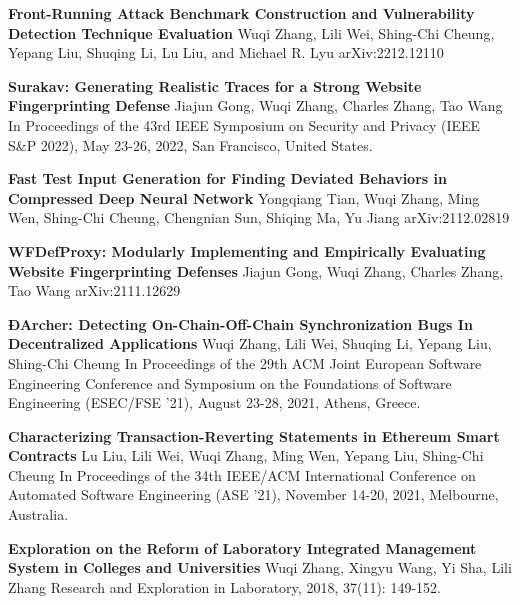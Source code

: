 %
%
%


\begin{scholarship}
	{\textbf{Front-Running Attack Benchmark Construction and Vulnerability Detection Technique Evaluation}}
	{Wuqi Zhang, Lili Wei, Shing-Chi Cheung, Yepang Liu, Shuqing Li, Lu Liu, and Michael R. Lyu}
	\scholarshipentry{}
	{arXiv:2212.12110}

	{\textbf{Surakav: Generating Realistic Traces for a Strong Website Fingerprinting Defense}}
	{Jiajun Gong, Wuqi Zhang, Charles Zhang, Tao Wang}
	\scholarshipentry{}
	{In Proceedings of the 43rd IEEE Symposium on Security and Privacy (IEEE S\&P 2022), May 23-26, 2022, San Francisco, United States.}

	{\textbf{Fast Test Input Generation for Finding Deviated Behaviors in Compressed Deep Neural Network}}
	{Yongqiang Tian, Wuqi Zhang, Ming Wen, Shing-Chi Cheung, Chengnian Sun, Shiqing Ma, Yu Jiang}
	\scholarshipentry{}
	{arXiv:2112.02819}

	{\textbf{WFDefProxy: Modularly Implementing and Empirically Evaluating Website Fingerprinting Defenses}}
	{Jiajun Gong, Wuqi Zhang, Charles Zhang, Tao Wang}
	\scholarshipentry{}
	{arXiv:2111.12629}

	{\textbf{ÐArcher: Detecting On-Chain-Off-Chain Synchronization Bugs In Decentralized Applications}}
	{Wuqi Zhang, Lili Wei, Shuqing Li, Yepang Liu, Shing-Chi Cheung}
	\scholarshipentry{}
	{In Proceedings of the 29th ACM Joint European Software Engineering Conference and Symposium on the Foundations of Software Engineering (ESEC/FSE '21), August 23-28, 2021, Athens, Greece.}

	{\textbf{Characterizing Transaction-Reverting Statements in Ethereum Smart Contracts}}
	{Lu Liu, Lili Wei, Wuqi Zhang, Ming Wen, Yepang Liu, Shing-Chi Cheung}
	\scholarshipentry{}
	{In Proceedings of the 34th IEEE/ACM International Conference on Automated Software Engineering (ASE ’21), November 14-20, 2021, Melbourne, Australia.}

	{\textbf{Exploration on the Reform of Laboratory Integrated Management System in Colleges and Universities}}
	{Wuqi Zhang, Xingyu Wang, Yi Sha, Lili Zhang}
	\scholarshipentry{}
	{Research and Exploration in Laboratory, 2018, 37(11): 149-152.}
\end{scholarship}
